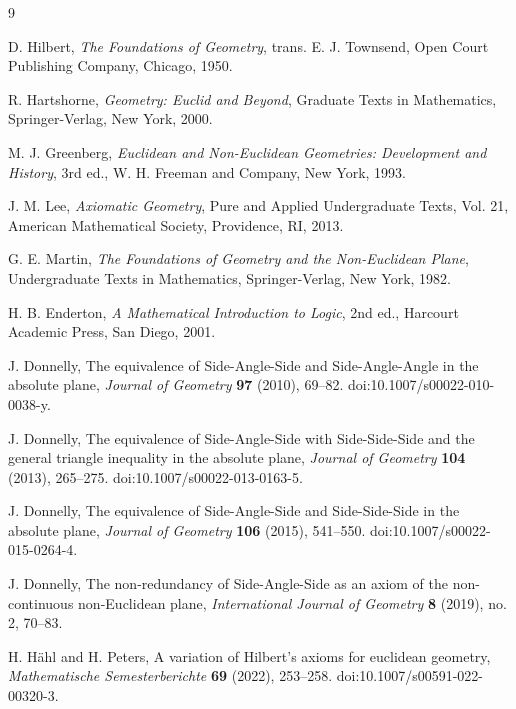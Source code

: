 \documentclass[11pt,a4paper]{article}
\theoremstyle{definition}
\theoremstyle{remark}
\numberwithin{equation}{section}
\begin{document}
\begin{thebibliography}{9}

D. Hilbert,
\textit{The Foundations of Geometry},
trans. E. J. Townsend,
Open Court Publishing Company, Chicago, 1950.

R. Hartshorne,
\textit{Geometry: Euclid and Beyond},
Graduate Texts in Mathematics,
Springer-Verlag, New York, 2000.

M. J. Greenberg,
\textit{Euclidean and Non-Euclidean Geometries: Development and History},
3rd ed.,
W. H. Freeman and Company, New York, 1993.

J. M. Lee,
\textit{Axiomatic Geometry},
Pure and Applied Undergraduate Texts, Vol. 21,
American Mathematical Society, Providence, RI, 2013.

G. E. Martin,
\textit{The Foundations of Geometry and the Non-Euclidean Plane},
Undergraduate Texts in Mathematics,
Springer-Verlag, New York, 1982.

H. B. Enderton,
\textit{A Mathematical Introduction to Logic},
2nd ed.,
Harcourt Academic Press, San Diego, 2001.

J. Donnelly,
The equivalence of Side-Angle-Side and Side-Angle-Angle in the absolute plane,
\textit{Journal of Geometry} \textbf{97} (2010), 69--82.
doi:10.1007/s00022-010-0038-y.

J. Donnelly,
The equivalence of Side-Angle-Side with Side-Side-Side and the general triangle inequality in the absolute plane,
\textit{Journal of Geometry} \textbf{104} (2013), 265--275.
doi:10.1007/s00022-013-0163-5.

J. Donnelly,
The equivalence of Side-Angle-Side and Side-Side-Side in the absolute plane,
\textit{Journal of Geometry} \textbf{106} (2015), 541--550.
doi:10.1007/s00022-015-0264-4.

J. Donnelly,
The non-redundancy of Side-Angle-Side as an axiom of the non-continuous non-Euclidean plane,
\textit{International Journal of Geometry} \textbf{8} (2019), no. 2, 70--83.

H. H\"{a}hl and H. Peters,
A variation of Hilbert's axioms for euclidean geometry,
\textit{Mathematische Semesterberichte} \textbf{69} (2022), 253--258.
doi:10.1007/s00591-022-00320-3.


\end{thebibliography}
\end{document}

